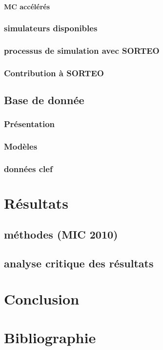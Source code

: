 \documentclass[12pt]{book}
\begin{document}
			\subsection{MC accélérés}

		\section{simulateurs disponibles}
		\section{processus de simulation avec SORTEO}
		\section{Contribution à SORTEO}

	\chapter{Base de donnée}
		\section{Présentation}
		\section{Modèles}
		\section{données clef} %


\part{Résultats}
	\chapter{méthodes (MIC 2010)}
        \chapter{analyse critique des résultats}

\part{Conclusion}




\part{Bibliographie}


\end{document}
